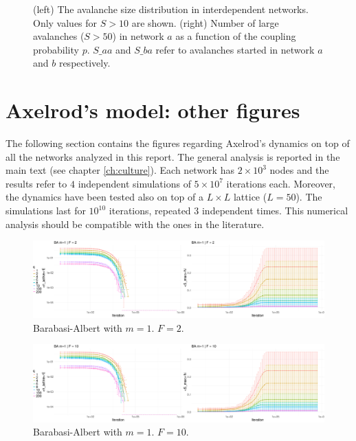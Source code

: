 \begin{figure}[h]
\begin{minipage}{0.5\textwidth}
    \end{minipage}
    \caption{(left) The avalanche size distribution in interdependent networks. Only values for $S>10$ are shown.  (right) Number of large avalanches ($S>50$) in network $a$ as a function of the coupling probability $p$. $S\_aa$ and $S\_ba$ refer to avalanches started in network $a$ and $b$ respectively.}
    \label{fig:figures}
\end{figure}

\newpage

\section{Axelrod's model: other figures}
\label{ch:sm_culture}
The following section contains the figures regarding Axelrod's dynamics on top of all the networks analyzed in this report. The general analysis is reported in the main text (see chapter \ref{ch:culture}). Each network has $2\times10^3$ nodes and the results refer to $4$ independent simulations of $5\times10^7$ iterations each. 
\noindent Moreover, the dynamics have been tested also on top of a $L\times L$ lattice ($L=50$). The simulations last for $10^{10}$ iterations, repeated $3$ independent times. This numerical analysis should be compatible with the ones in the literature. 

\begin{figure}[h] 
    \centering
    \includegraphics[width=1\textwidth]{images/task30/BA_1_2.png} 
    \vspace{-0.5cm}
    \caption{Barabasi-Albert with $m=1$. $F=2$.} 
\end{figure}

\begin{figure}[h] 
    \centering
    \includegraphics[width=1\textwidth]{images/task30/BA_1_10.png} 
    \vspace{-0.5cm}
    \caption{Barabasi-Albert with $m=1$. $F=10$.} 
\end{figure}


